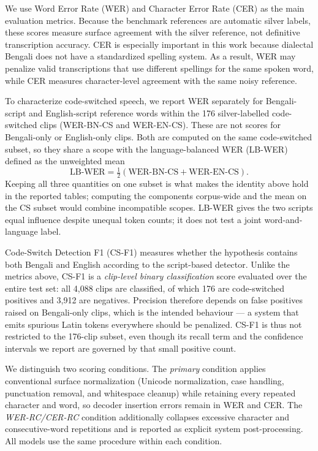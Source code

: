 \documentclass[journal]{IEEEtran}
\begin{document}
We use Word Error Rate (WER) and Character Error Rate (CER) as the main evaluation metrics. Because the benchmark references are automatic silver labels, these scores measure surface agreement with the silver reference, not definitive transcription accuracy. CER is especially important in this work because dialectal Bengali does not have a standardized spelling system. As a result, WER may penalize valid transcriptions that use different spellings for the same spoken word, while CER measures character-level agreement with the same noisy reference.

To characterize code-switched speech, we report WER separately for Bengali-script and English-script reference words within the 176 silver-labelled code-switched clips (WER-BN-CS and WER-EN-CS). These are not scores for Bengali-only or English-only clips. Both are computed on the same code-switched subset, so they share a scope with the language-balanced WER (LB-WER) defined as the unweighted mean
\begin{equation}
\text{LB-WER}=\tfrac{1}{2}(\text{WER-BN-CS}+\text{WER-EN-CS}).
\end{equation}
Keeping all three quantities on one subset is what makes the identity above hold in the reported tables; computing the components corpus-wide and the mean on the CS subset would combine incompatible scopes. LB-WER gives the two scripts equal influence despite unequal token counts; it does not test a joint word-and-language label.

Code-Switch Detection F1 (CS-F1) measures whether the hypothesis contains both Bengali and English according to the script-based detector. Unlike the metrics above, CS-F1 is a \emph{clip-level binary classification} score evaluated over the entire test set: all 4{,}088 clips are classified, of which 176 are code-switched positives and 3{,}912 are negatives. Precision therefore depends on false positives raised on Bengali-only clips, which is the intended behaviour --- a system that emits spurious Latin tokens everywhere should be penalized. CS-F1 is thus not restricted to the 176-clip subset, even though its recall term and the confidence intervals we report are governed by that small positive count.

We distinguish two scoring conditions. The \emph{primary} condition applies conventional surface normalization (Unicode normalization, case handling, punctuation removal, and whitespace cleanup) while retaining every repeated character and word, so decoder insertion errors remain in WER and CER. The \emph{WER-RC/CER-RC} condition additionally collapses excessive character and consecutive-word repetitions and is reported as explicit system post-processing. All models use the same procedure within each condition.
\end{document}
